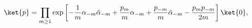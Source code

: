 \begin{equation}
 \ket{p}= \prod_{m \geq 1} 
   \exp \left[ -\frac{1}{m}\alpha_{-m}\tilde \alpha_{-m} 
    + \frac{p_m}{m}\alpha_{-m} + \frac{p_{-m}}{m} \tilde \alpha_{-m} 
    - \frac{p_{m} p_{-m}}{2m} \right] \ket{0} ,
\end{equation}


